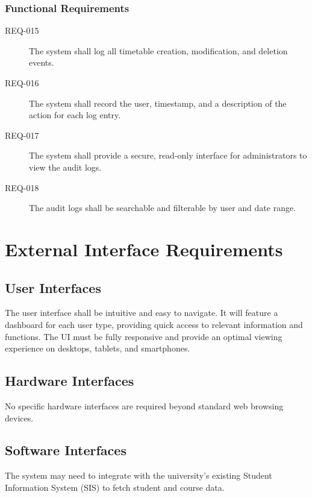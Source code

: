 \documentclass[11pt, a4paper]{article}
\begin{document}
\subsubsection{Functional Requirements}
\begin{description}
    \item[REQ-015] The system shall log all timetable creation, modification, and deletion events.
    \item[REQ-016] The system shall record the user, timestamp, and a description of the action for each log entry.
    \item[REQ-017] The system shall provide a secure, read-only interface for administrators to view the audit logs.
    \item[REQ-018] The audit logs shall be searchable and filterable by user and date range.
\end{description}

\section{External Interface Requirements}
\label{sec:external_interfaces}

\subsection{User Interfaces}
\label{sec:ui}
The user interface shall be intuitive and easy to navigate. It will feature a dashboard for each user type, providing quick access to relevant information and functions. The UI must be fully responsive and provide an optimal viewing experience on desktops, tablets, and smartphones.

\subsection{Hardware Interfaces}
\label{sec:hardware_interfaces}
No specific hardware interfaces are required beyond standard web browsing devices.

\subsection{Software Interfaces}
\label{sec:software_interfaces}
The system may need to integrate with the university's existing Student Information System (SIS) to fetch student and course data.
\end{document}
